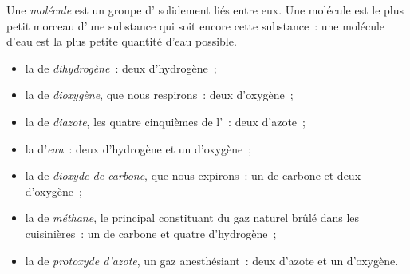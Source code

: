 \begin{definition}[Molécule]\label{def:g7:atoms-and-molecules:molecule}
Une \emph{molécule} est un groupe d' solidement
liés entre eux. Une molécule est le plus petit morceau d'une substance
qui soit encore cette substance~: une molécule d'eau est la plus petite
quantité d'eau possible.
\end{definition}

\begin{example}\label{ex:g7:atoms-and-molecules:seven}
\begin{itemize}
  \item la  de \emph{dihydrogène}~: deux  d'hydrogène~;
  \item la  de \emph{dioxygène}, que nous respirons~: deux
         d'oxygène~;
  \item la  de \emph{diazote}, les quatre cinquièmes de l'~:
        deux  d'azote~;
  \item la  d'\emph{eau}~: deux  d'hydrogène et un 
        d'oxygène~;
  \item la  de \emph{dioxyde de carbone}, que nous expirons~: un
         de carbone et deux  d'oxygène~;
  \item la  de \emph{méthane}, le principal constituant du gaz
        naturel brûlé dans les cuisinières~: un  de carbone et quatre
         d'hydrogène~;
  \item la  de \emph{protoxyde d'azote}, un gaz anesthésiant~:
        deux  d'azote et un  d'oxygène.
\end{itemize}
\end{example}

